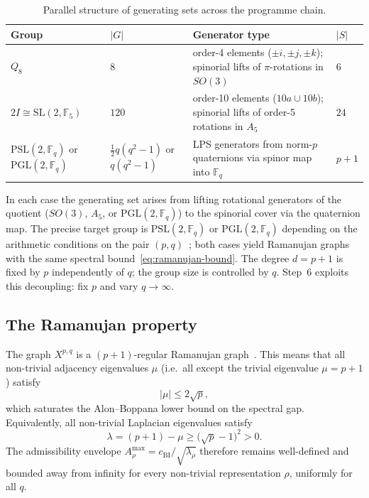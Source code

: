 \documentclass[11pt,a4paper]{article}
\begin{document}
    \begin{table}[h]
      \centering
      \renewcommand{\arraystretch}{1.3}
      \caption{Parallel structure of generating sets across the programme chain.}
      \label{tab:gensets}
      \small
      \begin{tabular}{p{}p{}p{}l}
        \hline
        Group & $|G|$ & Generator type & $|S|$ \\
        \hline
        $Q_8$ & $8$ &
        order-4 elements ($\pm i,\pm j,\pm k$);
        spinorial lifts of $\pi$-rotations in $SO(3)$ & $6$ \\
        $2I \cong \mathrm{SL}(2,\mathbb{F}_5)$ & $120$ &
        order-10 elements ($10a \cup 10b$);
        spinorial lifts of order-5 rotations in $A_5$ & $24$ \\
        $\mathrm{PSL}(2,\mathbb{F}_q)$ or $\mathrm{PGL}(2,\mathbb{F}_q)$ &
        $\tfrac{1}{2}q(q^2{-}1)$ or $q(q^2{-}1)$ &
        LPS generators from norm-$p$ quaternions
        via spinor map into $\mathbb{F}_q$ & $p{+}1$ \\
        \hline
      \end{tabular}
    \end{table}

    In each case the generating set arises from lifting rotational generators
    of the quotient ($SO(3)$, $A_5$, or $\mathrm{PGL}(2,\mathbb{F}_q)$) to
    the spinorial cover via the quaternion map.
    The precise target group is $\mathrm{PSL}(2,\mathbb{F}_q)$ or
    $\mathrm{PGL}(2,\mathbb{F}_q)$ depending on the arithmetic conditions on
    the pair $(p,q)$~\cite{LPS1988}; both cases yield Ramanujan graphs with
    the same spectral bound~\eqref{eq:ramanujan-bound}.
    The degree $d = p+1$ is fixed by $p$ independently of $q$; the group size
    is controlled by $q$.
    Step~6 exploits this decoupling: fix $p$ and vary $q \to \infty$.

  \subsection{The Ramanujan property}
    \label{sec:step6a-ramanujan}

    The graph $X^{p,q}$ is a $(p+1)$-regular Ramanujan graph~\cite{LPS1988}.
    This means that all non-trivial adjacency eigenvalues $\mu$
    (i.e.\ all except the trivial eigenvalue $\mu = p+1$) satisfy
    \begin{equation}
      |\mu| \leq 2\sqrt{p},
      \label{eq:ramanujan-bound}
    \end{equation}
    which saturates the Alon--Boppana lower bound on the spectral gap.
    Equivalently, all non-trivial Laplacian eigenvalues satisfy
    \begin{equation}
      \lambda = (p+1) - \mu \geq \bigl(\sqrt{p} - 1\bigr)^2 > 0.
      \label{eq:ramanujan-gap}
    \end{equation}
    The admissibility envelope $A^{\max}_\rho = c_{\mathrm{BI}}/\sqrt{\lambda_\rho}$
    therefore remains well-defined and bounded away from infinity for every
    non-trivial representation $\rho$, uniformly for all $q$.
\end{document}
